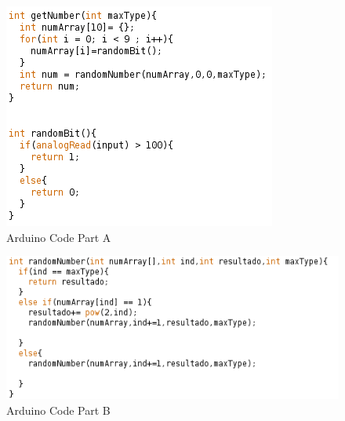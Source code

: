 \documentclass[twocolumn]{IEEEtran}
\begin{document}
\begin{enumerate}
    \begin{figure}[h!]
        \centering
        \includegraphics[width=\columnwidth]{src/ArduinoCode1.png}
		\caption{Arduino Code Part A}
        \label{fig:crossover}
		\end{figure}
        
        \begin{figure}[h!]
        \centering
        \includegraphics[width=\columnwidth]{src/ArduinoCode2.png}
		\caption{Arduino Code Part B}
        \label{fig:crossover}
		\end{figure}
        
\end{enumerate}
\end{document}
